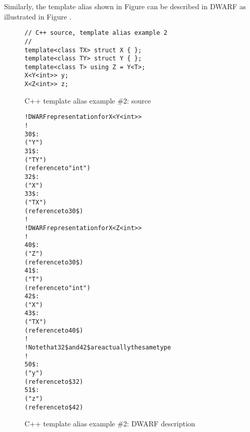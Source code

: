 \vspace*{0.7\baselineskip}
Similarly, the  template alias shown in
Figure 
can be described in DWARF as illustrated 
 in 
Figure .

\begin{figure}[ht]
\begin{lstlisting}
// C++ source, template alias example 2
//
template<class TX> struct X { };
template<class TY> struct Y { };
template<class T> using Z = Y<T>;
X<Y<int>> y;
X<Z<int>> z;
\end{lstlisting}
\caption{C++ template alias example \#2: source}
\label{fig:ctemplatealiasexample2source}
\end{figure}

\begin{figure}[ht]
\begin{dwflisting}
\begin{alltt}
! DWARF representation for X<Y<int>>
!
30\$:  \DWTAGstructuretype
          \DWATname("Y")
31\$:      \DWTAGtemplatetypeparameter
              \DWATname("TY")
              \DWATtype(reference to "int")
32\$:  \DWTAGstructuretype
          \DWATname("X")
33\$:      \DWTAGtemplatetypeparameter
              \DWATname("TX")
              \DWATtype(reference to 30\$)
!
! DWARF representation for X<Z<int>>
!
40\$:  \DWTAGtemplatealias
          \DWATname("Z")
          \DWATtype(reference to 30\$)
41\$:      \DWTAGtemplatetypeparameter
              \DWATname("T")
              \DWATtype(reference to "int")
42\$:  \DWTAGstructuretype
          \DWATname("X")
43\$:      \DWTAGtemplatetypeparameter
              \DWATname("TX")
              \DWATtype(reference to 40\$)
!
! Note that 32\$ and 42\$ are actually the same type
!
50\$:  \DWTAGvariable
          \DWATname("y")
          \DWATtype(reference to \$32)
51\$:  \DWTAGvariable
          \DWATname("z")
          \DWATtype(reference to \$42)
\end{alltt}
\end{dwflisting}
\caption{C++ template alias example \#2: DWARF description}
\label{fig:ctemplatealiasexample2dwarf}
\end{figure}

\clearpage
